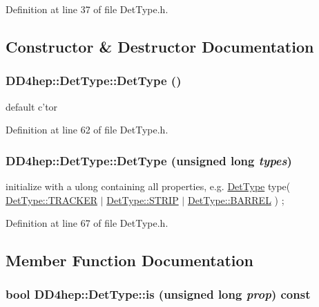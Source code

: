 Definition at line 37 of file DetType.h.

\subsection{Constructor \& Destructor Documentation}
\hypertarget{class_d_d4hep_1_1_det_type_afd9299bbb49ac7016d966fb94ad090c8}{
\subsubsection[{DetType}]{\setlength{\rightskip}{0pt plus 5cm}DD4hep::DetType::DetType ()}}
\label{class_d_d4hep_1_1_det_type_afd9299bbb49ac7016d966fb94ad090c8}


default c'tor 

Definition at line 62 of file DetType.h.\hypertarget{class_d_d4hep_1_1_det_type_a4d20c3eee13d6a2e8856fea8e266e36b}{
\subsubsection[{DetType}]{\setlength{\rightskip}{0pt plus 5cm}DD4hep::DetType::DetType (unsigned long {\em types})}}
\label{class_d_d4hep_1_1_det_type_a4d20c3eee13d6a2e8856fea8e266e36b}
initialize with a ulong containing all properties, e.g. \hyperlink{class_d_d4hep_1_1_det_type}{DetType} type( \hyperlink{class_d_d4hep_1_1_det_type_aca757d7a9b865d1fb8f7997eb5c0a72cae974ecec59fd2a2900db7e5f44cd0884}{DetType::TRACKER} $|$ \hyperlink{class_d_d4hep_1_1_det_type_aca757d7a9b865d1fb8f7997eb5c0a72ca47882873d22cd7ded73b8599713e5c98}{DetType::STRIP} $|$ \hyperlink{class_d_d4hep_1_1_det_type_aca757d7a9b865d1fb8f7997eb5c0a72caaca38656f429ac259f2aeb2a22359c1e}{DetType::BARREL} ) ; 

Definition at line 67 of file DetType.h.

\subsection{Member Function Documentation}
\hypertarget{class_d_d4hep_1_1_det_type_afa3e3d456652cb900e14ade69590c5b0}{
\subsubsection[{is}]{\setlength{\rightskip}{0pt plus 5cm}bool DD4hep::DetType::is (unsigned long {\em prop}) const}}
\label{class_d_d4hep_1_1_det_type_afa3e3d456652cb900e14ade69590c5b0}


